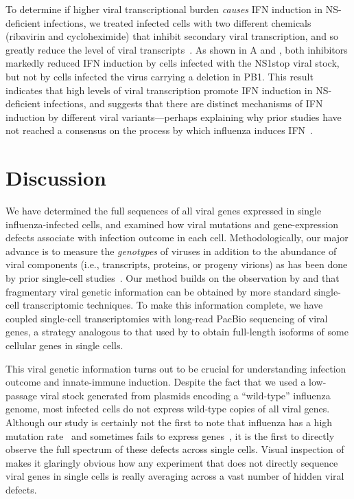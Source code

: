 \documentclass[9pt,lineno]{elife}
\begin{document}
To determine if higher viral transcriptional burden \emph{causes} IFN induction in NS-deficient infections, we treated infected cells with two different chemicals (ribavirin and cycloheximide) that inhibit secondary viral transcription, and so greatly reduce the level of viral transcripts~\citep{Vanderlinden:2016ec,Reuther:2015ef,Scholtissek:1976wg, killip2014activation}.
As shown in A and , both inhibitors markedly reduced IFN induction by cells infected with the NS1stop viral stock, but not by cells infected the virus carrying a deletion in PB1.
This result indicates that high levels of viral transcription promote IFN induction in NS-deficient infections, and suggests that there are distinct mechanisms of IFN induction by different viral variants---perhaps explaining why prior studies have not reached a consensus on the process by which influenza induces IFN~\citep{rehwinkel2010rig, weber2013incoming, killip2014activation}.

\section{Discussion}
We have determined the full sequences of all viral genes expressed in single influenza-infected cells, and examined how viral mutations and gene-expression defects associate with infection outcome in each cell.
Methodologically, our major advance is to measure the \emph{genotypes} of viruses in addition to the abundance of viral components (i.e., transcripts, proteins, or progeny virions) as has been done by prior single-cell studies~\citep{russell2018extreme, zanini2018single, zanini2018virus, steuerman2018dissection, saikia2018simultaneous, zhu2009growth, schulte2014single, akpinar2016high, heldt2015single, brooke2013most}.
Our method builds on the observation by \citet{saikia2018simultaneous} and \citet{zanini2018virus} that fragmentary viral genetic information can be obtained by more standard single-cell transcriptomic techniques.
To make this information complete, we have coupled single-cell transcriptomics with long-read PacBio sequencing of viral genes, a strategy analogous to that used by \cite{gupta2018single} to obtain full-length isoforms of some cellular genes in single cells.

This viral genetic information turns out to be crucial for understanding infection outcome and innate-immune induction.
Despite the fact that we used a low-passage viral stock generated from plasmids encoding a ``wild-type'' influenza genome, most infected cells do not express wild-type copies of all viral genes.
Although our study is certainly not the first to note that influenza has a high mutation rate~\citep{parvin1986measurement, suarez1992heterogeneity, suarez1994estimation, bloom2014experimentally, pauly2017novel} and sometimes fails to express genes~\citep{brooke2013most, heldt2015single, dou2017analysis, russell2018extreme}, it is the first to directly observe the full spectrum of these defects across single cells.
Visual inspection of  makes it glaringly obvious how any experiment that does not directly sequence viral genes in single cells is really averaging across a vast number of hidden viral defects.
\end{document}
